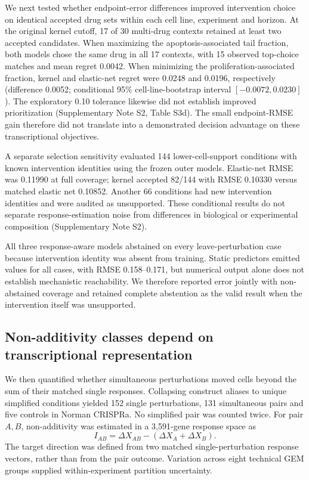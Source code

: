 \documentclass[a4paper,fleqn]{cas-sc}
\makeatletter
\DeclareRobustCommand{\rev}[1]{{\color{red}\def\@citecolor{black}\def\@linkcolor{red}\def\@urlcolor{red}#1}}
\makeatother
\begin{document}
\rev{We next tested whether endpoint-error differences improved intervention choice on identical accepted drug sets within each cell line, experiment and horizon.} \rev{At the original kernel cutoff, 17 of 30 multi-drug contexts retained at least two accepted candidates.} \rev{When maximizing the apoptosis-associated tail fraction, both models chose the same drug in all 17 contexts, with 15 observed top-choice matches and mean regret 0.0042.} \rev{When minimizing the proliferation-associated fraction, kernel and elastic-net regret were 0.0248 and 0.0196, respectively (difference 0.0052; conditional 95\% cell-line-bootstrap interval $[-0.0072,0.0230]$).} \rev{The exploratory 0.10 tolerance likewise did not establish improved prioritization (Supplementary Note S2, Table S3d).} \rev{The small endpoint-RMSE gain therefore did not translate into a demonstrated decision advantage on these transcriptional objectives.}

A separate selection sensitivity evaluated 144 lower-cell-support conditions with known intervention identities using the frozen outer models. Elastic-net RMSE was 0.11990 at full coverage; kernel accepted 82/144 with RMSE 0.10330 versus matched elastic net 0.10852. Another 66 conditions had new intervention identities and were audited as unsupported. These conditional results do not separate response-estimation noise from differences in biological or experimental composition (Supplementary Note S2).

All three response-aware models abstained on every leave-perturbation case because intervention identity was absent from training. Static predictors emitted values for all cases, with RMSE 0.158--0.171, but numerical output alone does not establish mechanistic reachability. We therefore reported error jointly with non-abstained coverage and retained complete abstention as the valid result when the intervention itself was unsupported.

\subsection*{\rev{Non-additivity classes depend on transcriptional representation}}
We then quantified whether simultaneous perturbations moved cells beyond the sum of their matched single responses. Collapsing construct aliases to unique simplified conditions yielded 152 single perturbations, 131 simultaneous pairs and five controls in Norman CRISPRa. No simplified pair was counted twice. For pair $A,B$, non-additivity was estimated in a 3,591-gene response space as
\begin{equation}
I_{AB}=\Delta X_{AB}-(\Delta X_A+\Delta X_B).
\end{equation}
The target direction was defined from two matched single-perturbation response vectors, rather than from the pair outcome. Variation across eight technical GEM groups supplied within-experiment partition uncertainty.
\end{document}
